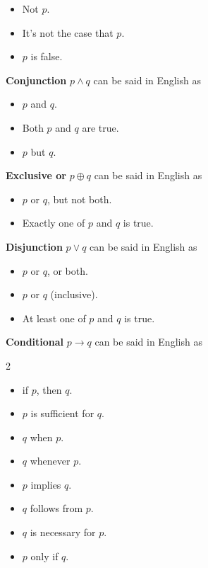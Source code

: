 \documentclass[12pt, oneside]{article}
\begin{document}
\vspace{-20pt}
\begin{itemize}
\item Not $p$.
\item It's not the case that $p$.
\item $p$ is false.
\end{itemize}

{\bf Conjunction} $p \land q$ can be said in English as

\vspace{-20pt}
\begin{itemize}
    \item $p$ and $q$.
    \item Both $p$ and $q$ are true.
    \item $p$ but $q$.
\end{itemize}

{\bf Exclusive or} $p \oplus q$ can be said in English as

\vspace{-20pt}
\begin{itemize}
    \item $p$ or $q$, but not both.
    \item Exactly one of $p$ and $q$ is true.
\end{itemize}

{\bf Disjunction} $p \lor q$ can be said in English as

\vspace{-20pt}
\begin{itemize}
    \item $p$ or $q$, or both.
    \item $p$ or $q$ (inclusive).
    \item At least one of $p$ and $q$ is true.
\end{itemize}

{\bf Conditional} $p \to q$ can be said in English as

\begin{multicols}{2}
\begin{itemize}
    \item if $p$, then $q$.
    \item $p$ is sufficient for $q$.
    \item $q$ when $p$.
    \item $q$ whenever $p$.
    \item $p$ implies $q$.
    \item $q$ follows from $p$.
    \item $q$ is necessary for $p$.
    \item $p$ only if $q$.
\end{itemize}
\end{multicols}
\end{document}
